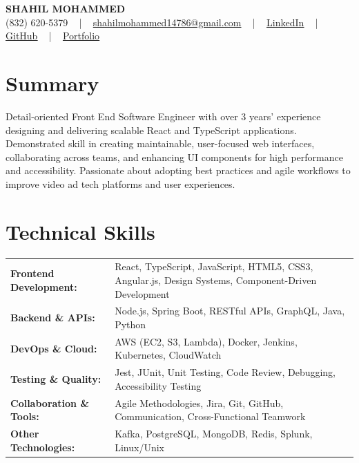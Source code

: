 \documentclass[letterpaper,11pt]{article}
\begin{document}
\begin{center}
    {\fontsize{14pt}{12pt}\selectfont \textbf{\MakeUppercase{Shahil Mohammed}}}\\ \vspace{2pt}
    \fontsize{10pt}{12pt}\selectfont (832) 620-5379 ~ | ~ \href{mailto:shahilmohammed14786@gmail.com}{shahilmohammed14786@gmail.com} ~ | ~  
    \href{https://www.linkedin.com/in/shahil-mohammed-9652931a1/}{\color{blue}\underline{LinkedIn}}  ~ | ~ 
    \href{https://github.com/freakbeast14}{\color{blue}\underline{GitHub}} ~ | ~ 
    \href{https://shahil-mohammed.netlify.app/}{\color{blue}\underline{Portfolio}}
    \vspace{-8pt}
\end{center}

\section{Summary}
\fontsize{9pt}{10pt}\selectfont
Detail-oriented Front End Software Engineer with over 3 years' experience designing and delivering scalable React and TypeScript applications. Demonstrated skill in creating maintainable, user-focused web interfaces, collaborating across teams, and enhancing UI components for high performance and accessibility. Passionate about adopting best practices and agile workflows to improve video ad tech platforms and user experiences.
 \vspace{-5pt}
 
\section{Technical Skills}
        \vspace{-14pt}
        \begin{table}[h]
            \fontsize{9pt}{10pt}\selectfont
            \begin{tabular}{p{0.3\linewidth} p{0.7\linewidth}}
                \textbf{Frontend Development:} & React, TypeScript, JavaScript, HTML5, CSS3, Angular.js, Design Systems, Component-Driven Development \\
                \textbf{Backend \& APIs:} & Node.js, Spring Boot, RESTful APIs, GraphQL, Java, Python \\
                \textbf{DevOps \& Cloud:} & AWS (EC2, S3, Lambda), Docker, Jenkins, Kubernetes, CloudWatch \\
                \textbf{Testing \& Quality:} & Jest, JUnit, Unit Testing, Code Review, Debugging, Accessibility Testing \\
                \textbf{Collaboration \& Tools:} & Agile Methodologies, Jira, Git, GitHub, Communication, Cross-Functional Teamwork \\
                \textbf{Other Technologies:} & Kafka, PostgreSQL, MongoDB, Redis, Splunk, Linux/Unix \\
            \end{tabular}
        \end{table}
 \vspace{-15pt}
 
\end{document}
